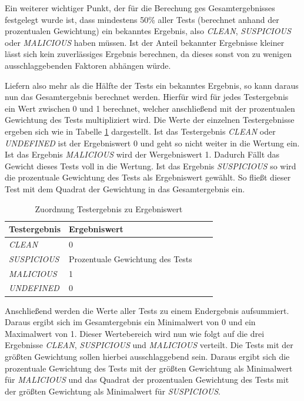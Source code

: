 Ein weiterer wichtiger Punkt, der für die Berechung ges Gesamtergebnisses festgelegt wurde ist, dass mindestens 50\% aller Tests (berechnet anhand der prozentualen Gewichtung) ein bekanntes Ergebnis, also \textit{CLEAN}, \textit{SUSPICIOUS} oder \textit{MALICIOUS} haben müssen. Ist der Anteil bekannter Ergebnisse kleiner lässt sich kein zuverlässiges Ergebnis berechnen, da dieses sonst von zu wenigen ausschlaggebenden Faktoren abhängen würde.

Liefern also mehr als die Hälfte der Tests ein bekanntes Ergebnis, so kann daraus nun das Gesamtergebnis berechnet werden. Hierfür wird für jedes Testergebnis ein Wert zwischen 0 und 1 berechnet, welcher anschließend mit der prozentualen Gewichtung des Tests multipliziert wird. Die Werte der einzelnen Testergebnisse ergeben sich wie in Tabelle \ref{tbl:test-values} dargestellt. Ist das Testergebnis \textit{CLEAN} oder \textit{UNDEFINED} ist der Ergebniswert 0 und geht so nicht weiter in die Wertung ein. Ist das Ergebnis \textit{MALICIOUS} wird der Wergebniswert 1. Dadurch Fällt das Gewicht dieses Tests voll in die Wertung. Ist das Ergebnis \textit{SUSPICIOUS} so wird die prozentuale Gewichtung des Tests als Ergebniswert gewählt. So fließt dieser Test mit dem Quadrat der Gewichtung in das Gesamtergebnis ein.

\begin{table}[H]
\centering
\begin{tabular}{|l|l|l|l|}
\hline
\textbf{Testergebnis} & \textbf{Ergebniswert}\\\hline
\textit{CLEAN} & 0\\\hline
\textit{SUSPICIOUS} & Prozentuale Gewichtung des Tests\\\hline
\textit{MALICIOUS} & 1\\\hline
\textit{UNDEFINED} & 0\\\hline
\end{tabular}
\caption{Zuordnung Testergebnis zu Ergebniswert}
\label{tbl:test-values}
\end{table}

Anschließend werden die Werte aller Tests zu einem Endergebnis aufsummiert. Daraus ergibt sich im Gesamtergebnis ein Minimalwert von 0 und ein Maximalwert von 1. Dieser Wertebereich wird nun wie folgt auf die drei Ergebnisse \textit{CLEAN}, \textit{SUSPICIOUS} und \textit{MALICIOUS} verteilt. Die Tests mit der größten Gewichtung sollen hierbei ausschlaggebend sein. Daraus ergibt sich die prozentuale Gewichtung des Tests mit der größten Gewichtung als Minimalwert für \textit{MALICIOUS} und das Quadrat der prozentualen Gewichtung des Tests mit der größten Gewichtung als Minimalwert für \textit{SUSPICIOUS}.

